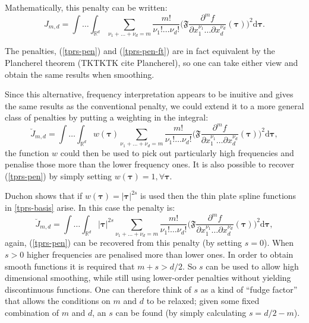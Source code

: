 Mathematically, this penalty can be written:
\begin{equation}
J_{m,d} = \int \ldots \int_{\mathbb{R}^d} \sum_{\nu_1 + \dots + \nu_d=m} \frac{m!}{\nu_1! \dots \nu_d!}\Big( \mathfrak{F} \frac{\partial^m f}{\partial x_1^{\nu_1} \ldots  \partial x_d^{\nu_d}}(\boldsymbol{\tau}) \Big)^2 \text{d} \boldsymbol{\tau}.
\label{tprs-pen-ft}
\end{equation}

The penalties, (\ref{tprs-pen}) and (\ref{tprs-pen-ft}) are in fact equivalent by the Plancherel theorem (TKTKTK cite Plancherel), so one can take either view and obtain the same results when smoothing. 

Since this alternative, frequency interpretation appears to be inuitive and gives the same results as the conventional penalty, we could extend it to a more general class of penalties by putting a weighting in the integral:
\begin{equation*}
\breve{J}_{m,d} = \int \ldots \int_{\mathbb{R}^d} w(\boldsymbol{\tau}) \sum_{\nu_1 + \dots + \nu_d=m} \frac{m!}{\nu_1! \dots \nu_d!}\Big( \mathfrak{F} \frac{\partial^m f}{\partial x_1^{\nu_1} \ldots  \partial x_d^{\nu_d}}(\boldsymbol{\tau}) \Big)^2 \text{d} \boldsymbol{\tau},
\end{equation*}
the function $w$ could then be used to pick out particularly high frequencies and penalise those more than the lower frequency ones. It is also possible to recover (\ref{tprs-pen}) by simply setting $w(\boldsymbol{\tau})=1, \forall \boldsymbol{\tau}$.

Duchon shows that if $w(\boldsymbol{\tau})= \lvert \boldsymbol{\tau} \rvert^{2s}$ is used then the thin plate spline functions in \ref{tprs-basis} arise. In this case the penalty is:
\begin{equation}
\breve{J}_{m,d} = \int \ldots \int_{\mathbb{R}^d} \lvert \boldsymbol{\tau} \rvert^{2s} \sum_{\nu_1 + \dots + \nu_d=m} \frac{m!}{\nu_1! \dots \nu_d!}\Big( \mathfrak{F} \frac{\partial^m f}{\partial x_1^{\nu_1} \ldots  \partial x_d^{\nu_d}}(\boldsymbol{\tau}) \Big)^2 \text{d} \boldsymbol{\tau},
\label{duchon-penalty}
\end{equation}
again, (\ref{tprs-pen}) can be recovered from this penalty (by setting $s=0$). When $s>0$ higher frequencies are penalised more than lower ones. In order to obtain smooth functions it is required that $m+s>d/2$. So $s$ can be used to allow high dimensional smoothing, while still using lower-order penalties without yielding discontinuous functions. One can therefore think of $s$ as a kind of ``fudge factor'' that allows the conditions on $m$ and $d$ to be relaxed; given some fixed combination of $m$ and $d$, an $s$ can be found (by simply calculating $s=d/2-m$).

